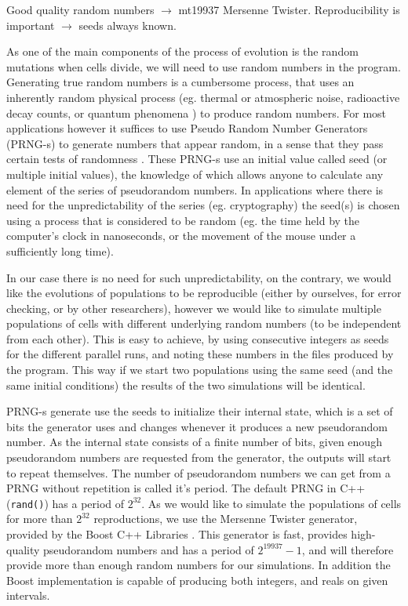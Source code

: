 \documentclass[10pt,a4paper]{article}
\begin{document}
Good quality random numbers $\rightarrow$ mt19937 Mersenne Twister. Reproducibility is important $\rightarrow$ seeds always known. 

As one of the main components of the process of evolution is the random mutations when cells divide, we will need to use random numbers in the program. Generating true random numbers is a cumbersome process, that uses an inherently random physical process (eg. thermal or atmospheric noise, radioactive decay counts, or quantum phenomena \cite{truerandom}) to produce random numbers. For most applications however it suffices to use Pseudo Random Number Generators (PRNG-s) to generate numbers that appear random, in a sense that they pass certain tests of randomness \cite[]{randomtests}. These PRNG-s use an initial value called seed (or multiple initial values), the knowledge of which allows anyone to calculate any element of the series of pseudorandom numbers. In applications where there is need for the unpredictability of the series (eg. cryptography) the seed(s) is chosen using a process that is considered to be random (eg. the time held by the computer's clock in nanoseconds, or the movement of the mouse under a sufficiently long time).

In our case there is no need for such unpredictability, on the contrary, we would like the evolutions of populations to be reproducible (either by ourselves, for error checking, or by other researchers), however we would like to simulate multiple populations of cells with different underlying random numbers (to be independent from each other). This is easy to achieve, by using consecutive integers as seeds for the different parallel runs, and noting these numbers in the files produced by the program. This way if we start two populations using the same seed (and the same initial conditions) the results of the two simulations will be identical. 

PRNG-s generate use the seeds to initialize their internal state, which is a set of bits the generator uses and changes whenever it produces a new pseudorandom number. As the internal state consists of a finite number of bits, given enough pseudorandom numbers are requested from the generator, the outputs will start to repeat themselves. The number of pseudorandom numbers we can get from a PRNG without repetition is called it's period. The default PRNG in C++ (\texttt{rand()}) has a period of $2^{32}$. As we would like to simulate the populations of cells for more than $2^{32}$ reproductions, we use the Mersenne Twister \cite{mersennetwister} generator, provided by the Boost C++ Libraries \cite{boostlibraries}. This generator is fast, provides high-quality pseudorandom numbers and has a period of $2^{19937}-1$, and will therefore provide more than enough random numbers for our simulations. In addition the Boost implementation is capable of producing both integers, and reals on given intervals. 
\end{document}
